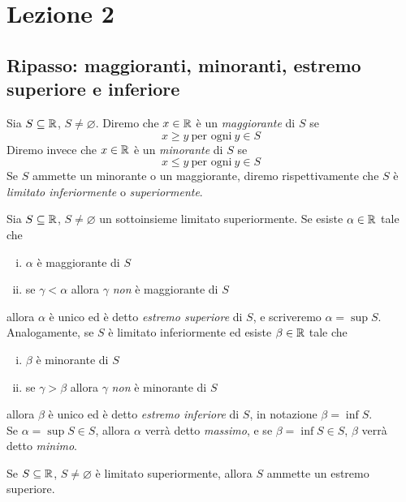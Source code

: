 \section{Lezione 2}
\subsection{Ripasso: maggioranti, minoranti, estremo superiore e inferiore}
\begin{definition}
    \label{def:2.1}
    Sia $S\subseteq \amsbb{R}$, $S\ne \varnothing$. Diremo che $x\in\amsbb{R}$ è un \emph{maggiorante} di $S$ se
    \[
    x\ge y \ \text{per ogni} \ y\in S
    \]
    Diremo invece che $x\in\amsbb{R}$ è un \emph{minorante} di $S$ se 
    \[
    x\le y \ \text{per ogni} \ y\in S
    \]
    Se $S$ ammette un minorante o un maggiorante, diremo rispettivamente che $S$ è \emph{limitato inferiormente} o \emph{superiormente}.
\end{definition}
\begin{definition}
    \label{def:2.2}
    Sia $S\subseteq \amsbb{R}$, $S\ne \varnothing$ un sottoinsieme limitato superiormente. Se esiste $\alpha\in\amsbb{R}$ tale che
    \begin{enumerate}[(i)]
        \item $\alpha$ è maggiorante di $S$
        \item se $\gamma <\alpha$ allora $\gamma$ \emph{non} è maggiorante di $S$
    \end{enumerate}
    allora $\alpha$ è unico ed è detto \emph{estremo superiore} di $S$, e scriveremo $\alpha = \sup S$.\\
    Analogamente, se $S$ è limitato inferiormente ed esiste $\beta\in\amsbb{R}$ tale che
    \begin{enumerate}[(i)]
        \item $\beta$ è minorante di $S$
        \item se $\gamma>\beta$ allora $\gamma$ \emph{non} è minorante di $S$
    \end{enumerate}
    allora $\beta$ è unico ed è detto \emph{estremo inferiore} di $S$, in notazione $\beta = \inf S$.\\
    Se $\alpha = \sup S \in S$, allora $\alpha$ verrà detto \emph{massimo}, e se $\beta = \inf S \in S$, $\beta$ verrà detto \emph{minimo}.
\end{definition}
\begin{theorem}
    \label{th:2.1}
    Se $S\subseteq \amsbb{R}$, $S\ne \varnothing$ è limitato superiormente, allora $S$ ammette un estremo superiore.
\end{theorem}
